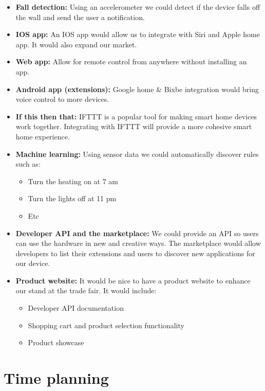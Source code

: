 \documentclass[onecolumn]{IEEEtran}
\begin{document}
\begin{itemize}
    \item \textbf{Fall detection:} Using an accelerometer we could detect if the device falls off the wall and send the user a notification.
    \item \textbf{IOS app:} An IOS app would allow us to integrate with Siri and Apple home app. It would also expand our market.
    \item \textbf{Web app:} Allow for remote control from anywhere without installing an app.
    \item \textbf{Android app (extensions):} Google home \& Bixbe integration would bring voice control to more devices.
    \item \textbf{If this then that:} IFTTT is a popular tool for making smart home devices work together. Integrating with IFTTT will provide a more cohesive smart home experience.
    \item \textbf{Machine learning:} Using sensor data we could automatically discover rules such as:
        \begin{itemize}
            \item Turn the heating on at 7 am
            \item Turn the lights off at 11 pm
            \item Etc
        \end{itemize}
    \item \textbf{Developer API and the marketplace:} We could provide an API so users can use the hardware in new and creative ways. The marketplace would allow developers to list their extensions and users to discover new applications for our device.
    \item \textbf{Product website:} It would be nice to have a product website to enhance our stand at the trade fair. It would include:
        \begin{itemize}
            \item Developer API documentation
            \item Shopping cart and product selection functionality
            \item Product showcase
        \end{itemize}
\end{itemize}

\section{Time planning}
\end{document}
